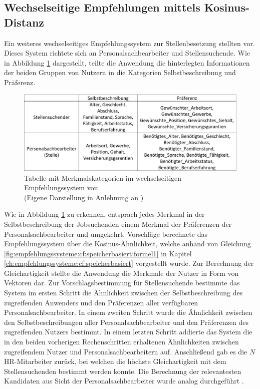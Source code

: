 \subsection{Wechselseitige Empfehlungen mittels Kosinus-Distanz}
\label{ch:verwandteArbeiten:nichtAufDemPEFitBasierendeBilateraleSysteme:nutzer}
Ein weiteres wechselseitiges Empfehlungssystem zur Stellenbesetzung stellten \textcite[S. 1ff.]{wenxing:2015} vor. Dieses System richtete sich an Personalsachbearbeiter und Stellensuchende. Wie in Abbildung \ref{fig:verwandteArbeiten:nichtAufDemPEFitBasierendeBilateraleSysteme:abb1} dargestellt, teilte die Anwendung die hinterlegten Informationen der beiden Gruppen von Nutzern in die Kategorien Selbstbeschreibung und Präferenz.

\begin{figure}[h]
	\centering
	\includegraphics[width=1\textwidth]{gfx/hong-tabelle.png}
	\caption{Tabelle mit Merkmalskategorien im wechselseitigen Empfehlungssystem von \textcite[S. 2]{wenxing:2015}\\
	(Eigene Darstellung in Anlehnung an \cite[S. 2]{wenxing:2015})}
	\label{fig:verwandteArbeiten:nichtAufDemPEFitBasierendeBilateraleSysteme:abb1}
\end{figure}

Wie in Abbildung \ref{fig:verwandteArbeiten:nichtAufDemPEFitBasierendeBilateraleSysteme:abb1} zu erkennen, entsprach jedes Merkmal in der Selbstbeschreibung der Jobsuchenden einem Merkmal der Präferenzen der Personalsachbearbeiter und umgekehrt. Vorschläge berechnete das Empfehlungssystem über die Kosinus-Ähnlichkeit, welche anhand von Gleichung \ref{fig:empfehlungssysteme:cf:speicherbasiert:formel1} in Kapitel \ref{ch:empfehlungssysteme:cf:speicherbasiert} vorgestellt wurde. Zur Berechnung der Gleichartigkeit stellte die Anwendung die Merkmale der Nutzer in Form von Vektoren dar. Zur Vorschlagsbestimmung für Stellensuchende bestimmte das System im ersten Schritt die Ähnlichkeit zwischen der Selbstbeschreibung des zugreifenden Anwenders und den Präferenzen aller verfügbaren Personalsachbearbeiter. In einem zweiten Schritt wurde die Ähnlichkeit zwischen den Selbstbeschreibungen aller Personalsachbearbeiter und den Präferenzen des zugreifenden Nutzers bestimmt. In einem letzten Schritt addierte das System die in den beiden vorherigen Rechenschritten erhaltenen Ähnlichkeiten zwischen zugreifendem Nutzer und Personalsachbearbeitern auf. Anschließend gab es die $N$ HR-Mitarbeiter zurück, bei welchen die höchste Gleichartigkeit mit dem Stellensuchenden bestimmt werden konnte. Die Berechnung der relevantesten Kandidaten aus Sicht der Personalsachbearbeiter wurde analog durchgeführt \cite[S. 2f.]{wenxing:2015}.

